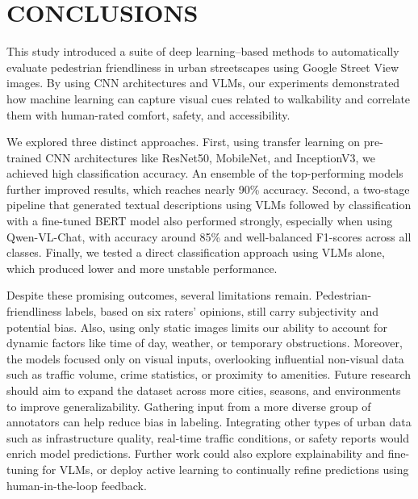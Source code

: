 \documentclass[11pt]{article}
\begin{document}
\section{CONCLUSIONS}
This study introduced a suite of deep learning–based methods to automatically evaluate pedestrian friendliness in urban streetscapes using Google Street View images. By using CNN architectures and VLMs, our experiments demonstrated how machine learning can capture visual cues related to walkability and correlate them with human-rated comfort, safety, and accessibility.

We explored three distinct approaches. First, using transfer learning on pre-trained CNN architectures like ResNet50, MobileNet, and InceptionV3, we achieved high classification accuracy. An ensemble of the top-performing models further improved results, which reaches nearly 90\% accuracy. Second, a two-stage pipeline that generated textual descriptions using VLMs followed by classification with a fine-tuned BERT model also performed strongly, especially when using Qwen-VL-Chat, with accuracy around 85\% and well-balanced F1-scores across all classes. Finally, we tested a direct classification approach using VLMs alone, which produced lower and more unstable performance. 

Despite these promising outcomes, several limitations remain. Pedestrian-friendliness labels, based on six raters’ opinions, still carry subjectivity and potential bias. Also, using only static images limits our ability to account for dynamic factors like time of day, weather, or temporary obstructions. Moreover, the models focused only on visual inputs, overlooking influential non-visual data such as traffic volume, crime statistics, or proximity to amenities. Future research should aim to expand the dataset across more cities, seasons, and environments to improve generalizability. Gathering input from a more diverse group of annotators can help reduce bias in labeling. Integrating other types of urban data such as infrastructure quality, real-time traffic conditions, or safety reports would enrich model predictions. Further work could also explore explainability and fine-tuning for VLMs, or deploy active learning to continually refine predictions using human-in-the-loop feedback. 




\end{document}
